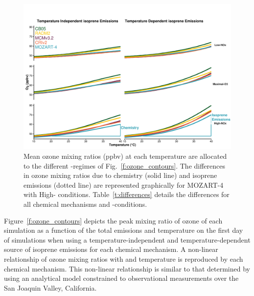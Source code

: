 \begin{figure}[t]%
    \centering%
    \caption{Mean ozone mixing ratios (ppbv) at each temperature are allocated to the different -regimes of Fig.~\ref{f:ozone_contours}. The differences in ozone mixing ratios due to chemistry (solid line) and isoprene emissions (dotted line) are represented graphically for MOZART-4 with High- conditions. Table~\ref{t:differences} details the differences for all chemical mechanisms and -conditions.}%
    \label{f:O3-T}%
    \includegraphics[width=\textwidth]{img/O3-T_correlation}%
    \vspace{-4mm}
\end{figure}

\begin{table}[t]%
    \centering%
    \caption{Increase in mean ozone mixing ratio (ppbv) due to chemistry and temperature-dependent isoprene emissions from the reference temperature ($20$~\degree C) at $40$~\degree C in the -regimes of Fig.~\ref{f:O3-T}.}%
    \label{t:differences}%
    \vspace{-4mm}
\end{table}

Figure~\ref{f:ozone_contours} depicts the peak mixing ratio of ozone of each simulation as a function of the total  emissions and temperature on the first day of simulations when using a temperature-independent and temperature-dependent source of isoprene emissions for each chemical mechanism.
A non-linear relationship of ozone mixing ratios with  and temperature is reproduced by each chemical mechanism.
This non-linear relationship is similar to that determined by \citet{Pusede:2014} using an analytical model constrained to observational measurements over the San Joaquin Valley, California.

